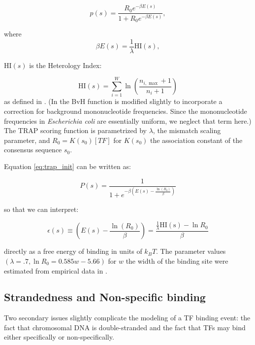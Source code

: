 \documentclass{article}
\begin{document}
\begin{equation}
  \label{eq:trap_init}
  p(s) = \frac{R_0e^{-\beta E(s)}}{1 + R_0e^{-\beta E(s)}},
\end{equation}

where
\begin{equation}
  \label{eq:trap}
  \beta E(s) = \frac{1}{\lambda} \mathrm{HI}(s),
\end{equation}

 $\mathrm{HI}(s)$ is the Heterology Index:

\begin{equation}
  \label{eq:bvh}
  \mathrm{HI}(s) = \displaystyle\sum_{i=1}^W\ln(\frac{n_{i,\max}+1}{n_{i}+1})
\end{equation}
as defined in \cite{berg87}.  (In \cite{roider07} the BvH
function is modified slightly to incorporate a correction for
background mononucleotide frequencies.  Since the mononucleotide
frequencies in \textit{Escherichia coli} are essentially uniform, we
neglect that term here.)  The TRAP scoring function is parametrized by
$\lambda$, the mismatch scaling parameter, and $R_0 = K(s_0)[TF]$ for
$K(s_0)$ the association constant of the consensus sequence $s_0$.

Equation \ref{eq:trap_init} can be written as:

\begin{equation}
\label{eq:bindingprob}
  P(s) = \frac{1}{1+e^{-\beta(E(s) - \frac{\ln(R_0)}{\beta})}}
\end{equation}

so that we can interpret:

\begin{equation}
  \label{eq:bindingenergy}
  \epsilon(s) \equiv (E(s) - \frac{\ln(R_0)}{\beta}) = \frac{\frac{1}{\lambda}\mathrm{HI(s)} - \ln R_0}{\beta}
\end{equation}

directly as a free energy of binding in units of $k_BT$.  The parameter values $(\lambda = .7, \ln R_0 = 0.585 w - 5.66)$ for $w$ the width of the binding site were estimated from empirical data in \cite{manke08}.

\subsection{Strandedness and Non-specific binding}

Two secondary issues slightly complicate the modeling of a TF binding
event: the fact that chromosomal DNA is double-stranded and the fact
that TFs may bind either specifically or non-specifically.
\end{document}
